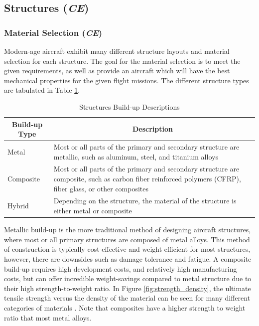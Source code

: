 \subsection{Structures (\textit{CE})}
\subsubsection{Material Selection (\textit{CE})}
Modern-age aircraft exhibit many different structure layouts and material selection for each structure. The goal for the material selection is to meet the given requirements, as well as provide an aircraft which will have the best mechanical properties for the given flight missions. The different structure types are tabulated in Table \ref{tab:structure_material_table}.

\begin{table}[!h]
\centering
\caption{Structures Build-up Descriptions }
\label{tab:structure_material_table}
\begin{tabular}{ |p{2cm}||p{13cm}| }
\toprule
\multicolumn{1}{|c||}{\textbf{Build-up Type}} & \multicolumn{1}{c|}{\textbf{Description}}                                                                                                                       \\ \hline\hline
Metal                                       & Most or all parts of the primary and secondary structure are metallic, such as aluminum, steel, and titanium alloys                                             \\ \hline
Composite                                    & Most or all parts of the primary and secondary structure are composite, such as carbon fiber reinforced polymers (CFRP), fiber glass, or other composites \\ \hline
Hybrid                                       & Depending on the structure, the material of the structure is either metal or composite                                                                            \\ \bottomrule
\end{tabular}
\end{table}

Metallic build-up is the more traditional method of designing aircraft structures, where most or all primary structures are composed of metal alloys. This method of construction is typically cost-effective and weight efficient for most structures, however, there are downsides such as damage tolerance and fatigue. A composite build-up requires high development costs, and relatively high manufacturing costs, but can offer incredible weight-savings compared to metal structure due to their high strength-to-weight ratio. In Figure \ref{fig:strength_density}, the ultimate tensile strength versus the density of the material can be seen for many different categories of materials \cite{ashby}. Note that composites have a higher strength to weight ratio that most metal alloys. 


